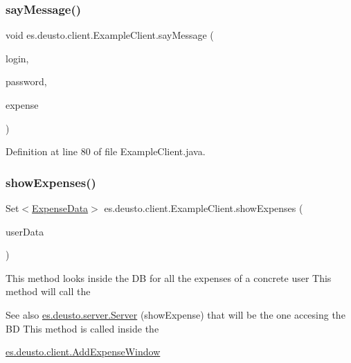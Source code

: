 \subsubsection{\texorpdfstring{say\+Message()}{sayMessage()}}
{\footnotesize\ttfamily void es.\+deusto.\+client.\+Example\+Client.\+say\+Message (\begin{DoxyParamCaption}\item[{String}]{login,  }\item[{String}]{password,  }\item[{\hyperlink{classes_1_1deusto_1_1server_1_1jdo_1_1_expense}{Expense}}]{expense }\end{DoxyParamCaption})}



Definition at line 80 of file Example\+Client.\+java.

\mbox{\label{classes_1_1deusto_1_1client_1_1_example_client_a527d2790290c153cae5b16133a38269a}} 
\subsubsection{\texorpdfstring{show\+Expenses()}{showExpenses()}}
{\footnotesize\ttfamily Set$<$\hyperlink{classes_1_1deusto_1_1serialization_1_1_expense_data}{Expense\+Data}$>$ es.\+deusto.\+client.\+Example\+Client.\+show\+Expenses (\begin{DoxyParamCaption}\item[{\hyperlink{classes_1_1deusto_1_1serialization_1_1_user_data}{User\+Data}}]{user\+Data }\end{DoxyParamCaption})}

This method looks inside the DB for all the expenses of a concrete user This method will call the \begin{DoxySeeAlso}{See also}
\hyperlink{classes_1_1deusto_1_1server_1_1_server}{es.\+deusto.\+server.\+Server} (show\+Expense) that will be the one accesing the BD This method is called inside the 

\hyperlink{classes_1_1deusto_1_1client_1_1_add_expense_window}{es.\+deusto.\+client.\+Add\+Expense\+Window} 
\end{DoxySeeAlso}

